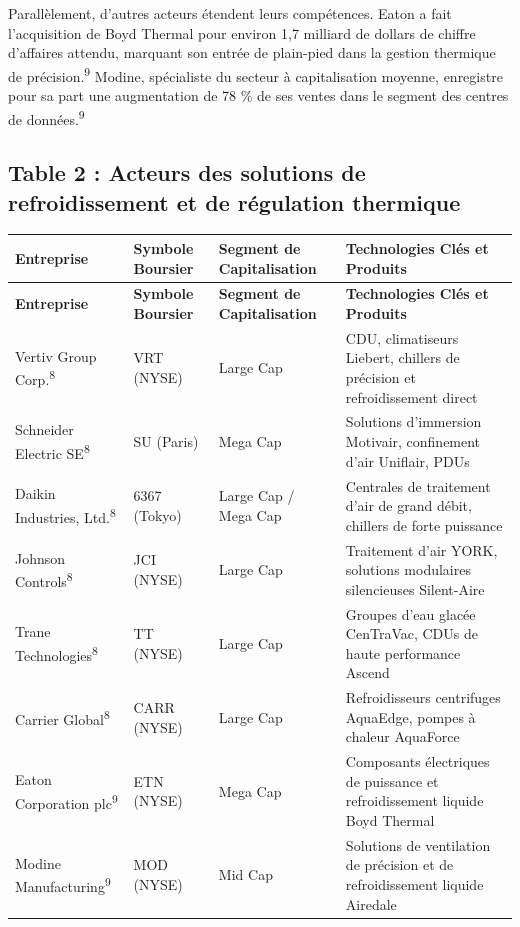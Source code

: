 \documentclass[11pt,a4paper]{article}
\begin{document}
Parallèlement, d'autres acteurs étendent leurs compétences. Eaton a fait l'acquisition de Boyd Thermal pour environ 1,7 milliard de dollars de chiffre d'affaires attendu, marquant son entrée de plain-pied dans la gestion thermique de précision.\textsuperscript{9} Modine, spécialiste du secteur à capitalisation moyenne, enregistre pour sa part une augmentation de 78 \% de ses ventes dans le segment des centres de données.\textsuperscript{9}

\subsection*{Table 2 : Acteurs des solutions de refroidissement et de régulation thermique}
\begin{longtable}{p{3cm} p{3.5cm} p{3cm} p{5cm}}
\toprule
\textbf{Entreprise} & \textbf{Symbole Boursier} & \textbf{Segment de Capitalisation} & \textbf{Technologies Clés et Produits} \\
\midrule
\endfirsthead
\toprule
\textbf{Entreprise} & \textbf{Symbole Boursier} & \textbf{Segment de Capitalisation} & \textbf{Technologies Clés et Produits} \\
\midrule
\endhead
Vertiv Group Corp.\textsuperscript{8} & VRT (NYSE) & Large Cap & CDU, climatiseurs Liebert, chillers de précision et refroidissement direct \\
Schneider Electric SE\textsuperscript{8} & SU (Paris) & Mega Cap & Solutions d'immersion Motivair, confinement d'air Uniflair, PDUs \\
Daikin Industries, Ltd.\textsuperscript{8} & 6367 (Tokyo) & Large Cap / Mega Cap & Centrales de traitement d'air de grand débit, chillers de forte puissance \\
Johnson Controls\textsuperscript{8} & JCI (NYSE) & Large Cap & Traitement d'air YORK, solutions modulaires silencieuses Silent-Aire \\
Trane Technologies\textsuperscript{8} & TT (NYSE) & Large Cap & Groupes d'eau glacée CenTraVac, CDUs de haute performance Ascend \\
Carrier Global\textsuperscript{8} & CARR (NYSE) & Large Cap & Refroidisseurs centrifuges AquaEdge, pompes à chaleur AquaForce \\
Eaton Corporation plc\textsuperscript{9} & ETN (NYSE) & Mega Cap & Composants électriques de puissance et refroidissement liquide Boyd Thermal \\
Modine Manufacturing\textsuperscript{9} & MOD (NYSE) & Mid Cap & Solutions de ventilation de précision et de refroidissement liquide Airedale \\

\end{longtable}
\end{document}
